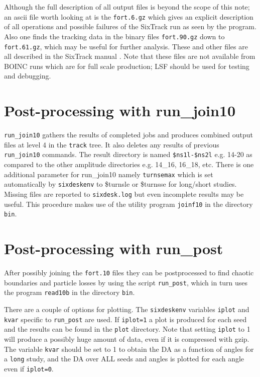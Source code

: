 \documentclass{cernatsnote}    %
\begin{document}
Although the full description of all output files is beyond the scope
of this note; an ascii file worth
looking at is the {\tt fort.6.gz} which gives an explicit description of
all operations and possible failures of the SixTrack run as seen by
the program. Also one finds the tracking data in the
binary files {\tt fort.90.gz} down to {\tt fort.61.gz}, which may be useful for further
analysis. These and other files are all described in the
SixTrack manual \cite{SixTrack}. Note that these files are not available
from BOINC runs which are for full scale production; LSF should be used
for testing and debugging. 

\section{Post-processing with run\_join10}
{\tt run\_join10} gathers the results of completed jobs and
produces combined output files at level 4 in the {\tt track} tree. 
It also deletes any results of previous {\tt run\_join10} commands.
The result directory is named {\tt \$ns1l-\$ns2l} e.g. 14-20 as compared to the
other amplitude directories e.g. 14\_16, 16\_18, etc.
There is one additional parameter for run\_join10 namely
{\tt turnsemax} which is set automatically by {\tt sixdeskenv} 
to \$turnsle or \$turnsse
for long/short studies. Missing files are reported to {\tt sixdesk.log}
but even incomplete results may be useful. This procedure makes use
of the utility program {\tt joinf10} in the directory {\tt bin}.

\section{Post-processing with run\_post}
%
\label{sec:run_post}
After possibly joining the {\tt fort.10} files they can be
postprocessed to find chaotic boundaries and particle losses by using
the script {\tt run\_post}, which in turn uses the program {\tt read10b}
in the directory {\tt bin}.  

There are a couple of options for plotting.
The  {\tt sixdeskenv} variables {\tt iplot} and {\tt kvar} specific to {\tt run\_post} are used.
If {\tt iplot=1} a plot is produced for each seed and the results
can be found in the {\tt plot} directory. Note that setting 
{\tt iplot} to 1 will produce a
possibly huge amount of data, even if it is compressed with gzip.
The variable {\tt kvar} should be set to 1 to obtain the DA
as a function of angles for a {\tt long} study,
and the DA over ALL seeds and angles is plotted for each angle
even if {\tt iplot=0}.
\end{document}
